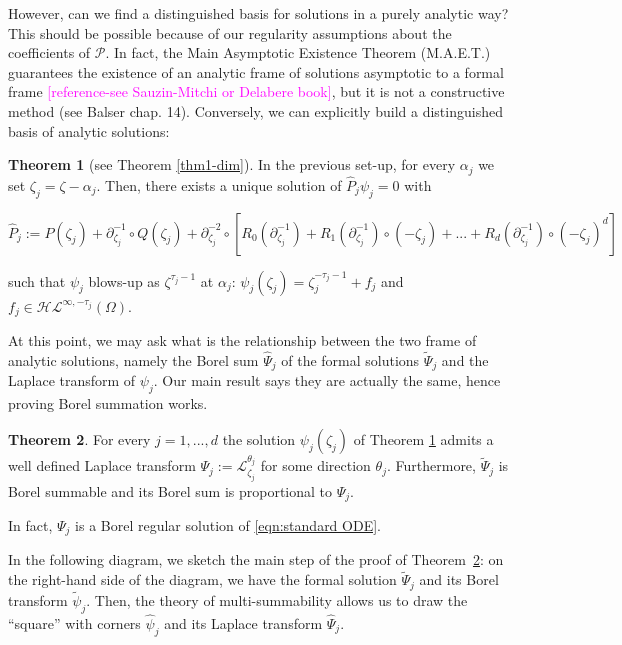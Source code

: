 \documentclass{article}
\theoremstyle{definition}
\newcommand{\series}[1]{\tilde{#1}}
\newcommand{\laplace}{\mathcal{L}}
\newtheorem{theorem}{Theorem}[section]
\begin{document}
However, can we find a distinguished basis for solutions in a purely analytic way? This should be possible because of our regularity assumptions about the coefficients of $\mathcal{P}$. In fact, the Main Asymptotic Existence Theorem (M.A.E.T.) guarantees the existence of an analytic frame of solutions asymptotic to a formal frame \textcolor{magenta}{[reference-see Sauzin-Mitchi or Delabere book]}, but it is not a constructive method (see Balser chap. 14). Conversely, we can explicitly build a distinguished basis of analytic solutions: 

\begin{theorem}[see Theorem \ref{thm1-dim}]\label{thm1}
In the previous set-up, for every $\alpha_j$ we set $\zeta_j=\zeta-\alpha_j$. Then, there exists a unique solution of $\hat{P}_j\psi_j=0$ with 

\begin{equation}
\hat{P}_j:=P(\zeta_j)+\partial_{\zeta_j}^{-1}\circ Q(\zeta_j)+\partial_{\zeta_j}^{-2}\circ\left[R_0(\partial_{\zeta_j}^{-1})+R_1(\partial_{\zeta_j}^{-1})\circ (-\zeta_j)+...+R_d(\partial_{\zeta_j}^{-1})\circ (-\zeta_j)^d\right]
\end{equation}

such that $\psi_j$ blows-up as $\zeta^{\tau_j-1}$ at $\alpha_j$:
${\psi}_j(\zeta_j)=\zeta_j^{-\tau_j-1}+f_j$ and $f_j\in\mathcal{HL}^{\infty,-\tau_j}(\Omega)$. 
\end{theorem}


At this point, we may ask what is the relationship between the two frame of analytic solutions, namely the Borel sum $\hat{\Psi}_j$ of the formal solutions $\series{\Psi}_j$ and the Laplace transform of $\psi_j$. Our main result says they are actually the same, hence proving Borel summation works. 
 
\begin{theorem}\label{thm2}
For every $j=1,...,d$ the solution $\psi_j(\zeta_j)$ of Theorem \ref{thm1} admits a well defined Laplace transform $\Psi_j:=\laplace_{\zeta_j}^{\theta_j}$ for some direction $\theta_j$.
Furthermore, $\tilde{\Psi}_j$ is Borel summable and its Borel sum is proportional to $\Psi_j$. 
\end{theorem}

In fact, $\Psi_j$ is a Borel regular solution of \eqref{eqn:standard ODE}.  

In the following diagram, we sketch the main step of the proof of Theorem~\ref{thm2}: on the right-hand side of the diagram, we have the formal solution $\series{\Psi }_j$ and its Borel transform $\series{\psi}_j$. Then, the theory of multi-summability allows us to draw the ``square'' with corners $\hat{\psi}_j$ and its Laplace transform $\hat{\Psi}_j$.  
\end{document}
